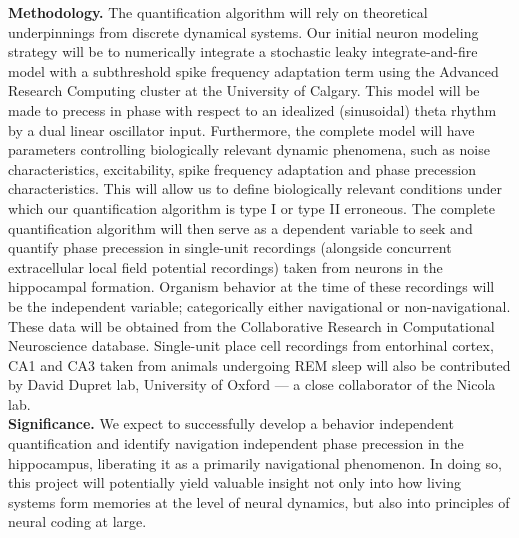 \documentclass[11pt, letterpaper]{article}
\begin{document}
{\bf Methodology.} The quantification algorithm will rely on theoretical underpinnings from discrete dynamical systems.
Our initial neuron modeling strategy will be to numerically integrate a stochastic leaky integrate-and-fire model with a subthreshold spike frequency adaptation term using the 
Advanced Research Computing cluster at the University of Calgary.
This model will be made to precess in phase with respect to an idealized (sinusoidal) theta rhythm by a dual linear oscillator input. Furthermore, the complete model will have parameters controlling biologically relevant dynamic phenomena, such as noise characteristics, excitability, 
spike frequency adaptation and phase precession characteristics. This will allow us to define biologically relevant conditions
under which our quantification algorithm is type I or type II erroneous.  
The complete quantification algorithm will then serve as a dependent variable to seek and quantify phase precession
in single-unit recordings (alongside concurrent extracellular local field potential recordings) taken from neurons in the hippocampal formation. 
Organism behavior at the time of these recordings will be the independent variable; categorically either navigational or non-navigational. These data will be 
obtained from the Collaborative Research in Computational Neuroscience database. Single-unit place cell recordings from entorhinal cortex, CA1 and CA3
taken from animals undergoing REM sleep will also be contributed by David Dupret lab, University of Oxford --- a close collaborator of the Nicola lab.
\\

{\bf Significance.} We expect to successfully develop a behavior independent quantification and identify navigation independent phase precession in the hippocampus, liberating it as a 
primarily navigational phenomenon. In doing so, this project will potentially yield valuable insight not only into how living systems form memories at the 
level of neural dynamics, but also into principles of neural coding at large. 

\end{document}
